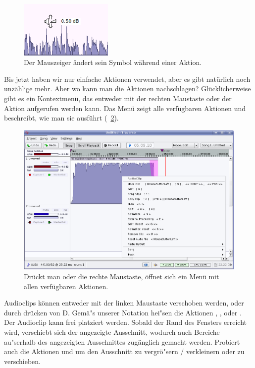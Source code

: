 \begin{figure}
 \centering\includegraphics[width=0.4\textwidth]{images/gain-cursor.png}
 \caption{Der Mauszeiger ändert sein Symbol während einer  Aktion.}
 \label{fig_gaincursor}
\end{figure}

Bis jetzt haben wir nur einfache Aktionen verwendet, aber es gibt natürlich noch unzählige mehr. Aber wo kann man die Aktionen nachschlagen? Glücklicherweise gibt es ein Kontextmenü, das entweder mit der rechten Maustaste oder der Aktion   aufgerufen werden kann. Das Menü zeigt alle verfügbaren Aktionen und beschreibt, wie man sie ausführt (\FigB\ \ref{fig_clipmenu}).

\begin{figure}
 \centering\includegraphics[width=\textwidth]{images/clipmenu.png}
 \caption{Drückt man  oder die rechte Maustaste, öffnet sich ein Menü mit allen verfügbaren Aktionen.}
 \label{fig_clipmenu}
\end{figure}

Audioclips können entweder mit der linken Maustaste verschoben werden, oder durch drücken von D. Gemä"s unserer Notation hei"sen die Aktionen , , oder . Der Audioclip kann frei platziert werden. Sobald der Rand des Fensters erreicht wird, verschiebt sich der angezeigte Ausschnitt, wodurch auch Bereiche au"serhalb des angezeigten Ausschnittes zugänglich gemacht werden. Probiert auch die Aktionen  und  um den Ausschnitt zu vergrö"sern / verkleinern oder zu verschieben.

